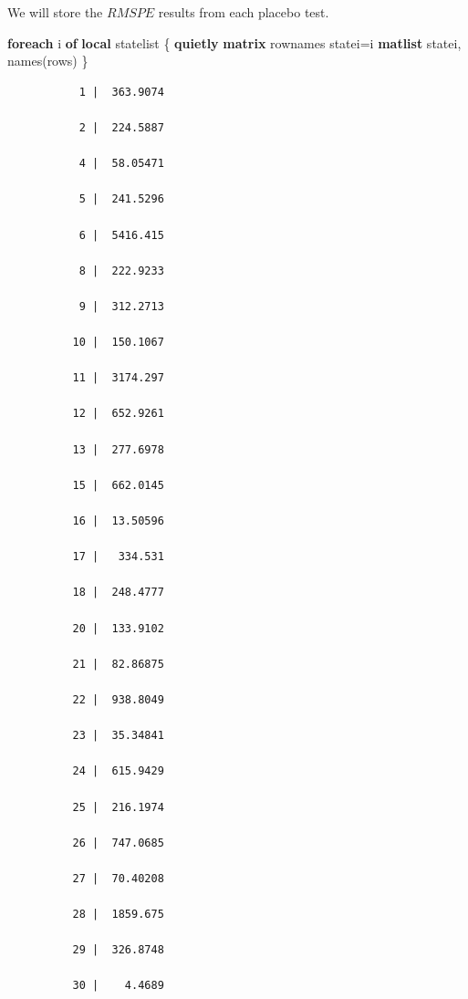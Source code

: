 \documentclass[
]{book}
\newenvironment{Shaded}{\begin{snugshade}}{\end{snugshade}}
\newcommand{\BaseNTok}[1]{\textcolor[rgb]{0.00,0.00,0.81}{#1}}
\newcommand{\FunctionTok}[1]{\textcolor[rgb]{0.13,0.29,0.53}{\textbf{#1}}}
\newcommand{\KeywordTok}[1]{\textcolor[rgb]{0.13,0.29,0.53}{\textbf{#1}}}
\newcommand{\NormalTok}[1]{#1}
\newcommand{\OtherTok}[1]{\textcolor[rgb]{0.56,0.35,0.01}{#1}}
\begin{document}
We will store the \(RMSPE\) results from each placebo test.

\begin{Shaded}
\begin{Highlighting}[]
\KeywordTok{foreach}\NormalTok{ i }\KeywordTok{of} \KeywordTok{local}\NormalTok{ statelist \{}
  \KeywordTok{quietly} \FunctionTok{matrix} \OtherTok{rownames}\NormalTok{ state}\OtherTok{\textasciigrave{}i\textquotesingle{}}\NormalTok{=}\OtherTok{\textasciigrave{}i\textquotesingle{}}
  \KeywordTok{matlist}\NormalTok{ state}\OtherTok{\textasciigrave{}i\textquotesingle{}}\NormalTok{, names(}\BaseNTok{rows}\NormalTok{) }
\NormalTok{\}}
\end{Highlighting}
\end{Shaded}

\begin{verbatim}
           1 |  363.9074 

           2 |  224.5887 

           4 |  58.05471 

           5 |  241.5296 

           6 |  5416.415 

           8 |  222.9233 

           9 |  312.2713 

          10 |  150.1067 

          11 |  3174.297 

          12 |  652.9261 

          13 |  277.6978 

          15 |  662.0145 

          16 |  13.50596 

          17 |   334.531 

          18 |  248.4777 

          20 |  133.9102 

          21 |  82.86875 

          22 |  938.8049 

          23 |  35.34841 

          24 |  615.9429 

          25 |  216.1974 

          26 |  747.0685 

          27 |  70.40208 

          28 |  1859.675 

          29 |  326.8748 

          30 |    4.4689 


\end{verbatim}
\end{document}
